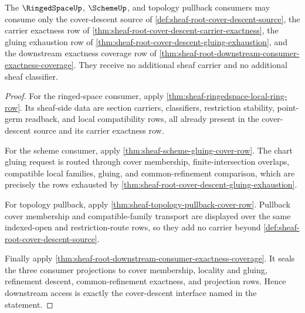 \begin{theorem}
\label{thm:sheaf-root-cover-descent-downstream-interface}
The $\RingedSpaceUp$, $\SchemeUp$, and topology pullback consumers may consume only the cover-descent source of \autoref{def:sheaf-root-cover-descent-source}, the carrier exactness row of \autoref{thm:sheaf-root-cover-descent-carrier-exactness}, the gluing exhaustion row of \autoref{thm:sheaf-root-cover-descent-gluing-exhaustion}, and the downstream exactness coverage row of \autoref{thm:sheaf-root-downstream-consumer-exactness-coverage}. They receive no additional sheaf carrier and no additional sheaf classifier.
\end{theorem}
\begin{proof}
For the ringed-space consumer, apply \autoref{thm:sheaf-ringedspace-local-ring-row}. Its sheaf-side data are section carriers, classifiers, restriction stability, point-germ readback, and local compatibility rows, all already present in the cover-descent source and its carrier exactness row.

For the scheme consumer, apply \autoref{thm:sheaf-scheme-gluing-cover-row}. The chart gluing request is routed through cover membership, finite-intersection overlaps, compatible local families, gluing, and common-refinement comparison, which are precisely the rows exhausted by \autoref{thm:sheaf-root-cover-descent-gluing-exhaustion}.

For topology pullback, apply \autoref{thm:sheaf-topology-pullback-cover-row}. Pullback cover membership and compatible-family transport are displayed over the same indexed-open and restriction-route rows, so they add no carrier beyond \autoref{def:sheaf-root-cover-descent-source}.

Finally apply \autoref{thm:sheaf-root-downstream-consumer-exactness-coverage}. It seals the three consumer projections to cover membership, locality and gluing, refinement descent, common-refinement exactness, and projection rows. Hence downstream access is exactly the cover-descent interface named in the statement.
\end{proof}
